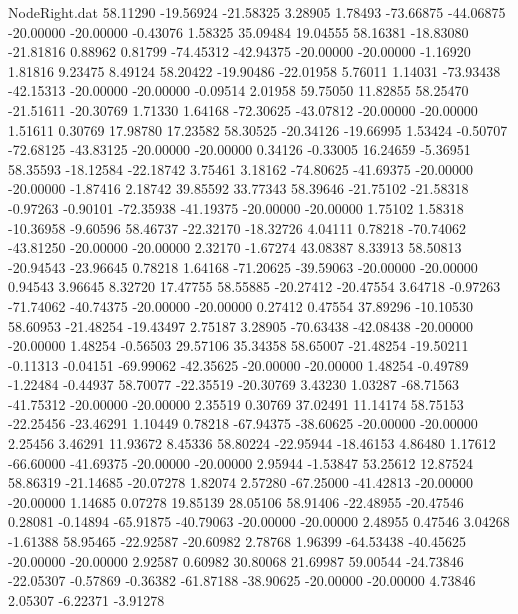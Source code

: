 \begin{filecontents}{NodeRight.dat}
  58.11290  -19.56924  -21.58325     3.28905    1.78493  -73.66875  -44.06875  -20.00000  -20.00000   -0.43076    1.58325   35.09484   19.04555
  58.16381  -18.83080  -21.81816     0.88962    0.81799  -74.45312  -42.94375  -20.00000  -20.00000   -1.16920    1.81816    9.23475    8.49124
  58.20422  -19.90486  -22.01958     5.76011    1.14031  -73.93438  -42.15313  -20.00000  -20.00000   -0.09514    2.01958   59.75050   11.82855
  58.25470  -21.51611  -20.30769     1.71330    1.64168  -72.30625  -43.07812  -20.00000  -20.00000    1.51611    0.30769   17.98780   17.23582
  58.30525  -20.34126  -19.66995     1.53424   -0.50707  -72.68125  -43.83125  -20.00000  -20.00000    0.34126   -0.33005   16.24659   -5.36951
  58.35593  -18.12584  -22.18742     3.75461    3.18162  -74.80625  -41.69375  -20.00000  -20.00000   -1.87416    2.18742   39.85592   33.77343
  58.39646  -21.75102  -21.58318    -0.97263   -0.90101  -72.35938  -41.19375  -20.00000  -20.00000    1.75102    1.58318  -10.36958   -9.60596
  58.46737  -22.32170  -18.32726     4.04111    0.78218  -70.74062  -43.81250  -20.00000  -20.00000    2.32170   -1.67274   43.08387    8.33913
  58.50813  -20.94543  -23.96645     0.78218    1.64168  -71.20625  -39.59063  -20.00000  -20.00000    0.94543    3.96645    8.32720   17.47755
  58.55885  -20.27412  -20.47554     3.64718   -0.97263  -71.74062  -40.74375  -20.00000  -20.00000    0.27412    0.47554   37.89296  -10.10530
  58.60953  -21.48254  -19.43497     2.75187    3.28905  -70.63438  -42.08438  -20.00000  -20.00000    1.48254   -0.56503   29.57106   35.34358
  58.65007  -21.48254  -19.50211    -0.11313   -0.04151  -69.99062  -42.35625  -20.00000  -20.00000    1.48254   -0.49789   -1.22484   -0.44937
  58.70077  -22.35519  -20.30769     3.43230    1.03287  -68.71563  -41.75312  -20.00000  -20.00000    2.35519    0.30769   37.02491   11.14174
  58.75153  -22.25456  -23.46291     1.10449    0.78218  -67.94375  -38.60625  -20.00000  -20.00000    2.25456    3.46291   11.93672    8.45336
  58.80224  -22.95944  -18.46153     4.86480    1.17612  -66.60000  -41.69375  -20.00000  -20.00000    2.95944   -1.53847   53.25612   12.87524
  58.86319  -21.14685  -20.07278     1.82074    2.57280  -67.25000  -41.42813  -20.00000  -20.00000    1.14685    0.07278   19.85139   28.05106
  58.91406  -22.48955  -20.47546     0.28081   -0.14894  -65.91875  -40.79063  -20.00000  -20.00000    2.48955    0.47546    3.04268   -1.61388
  58.95465  -22.92587  -20.60982     2.78768    1.96399  -64.53438  -40.45625  -20.00000  -20.00000    2.92587    0.60982   30.80068   21.69987
  59.00544  -24.73846  -22.05307    -0.57869   -0.36382  -61.87188  -38.90625  -20.00000  -20.00000    4.73846    2.05307   -6.22371   -3.91278

\end{filecontents}
